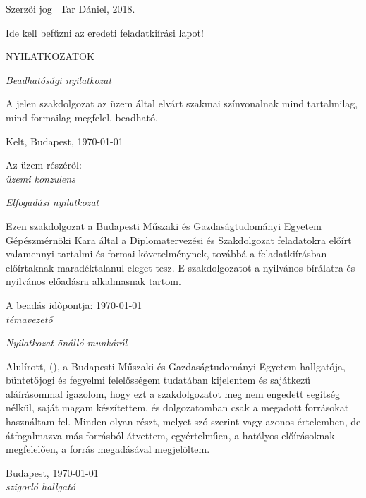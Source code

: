 \documentclass[../main.tex]{subfiles}
\begin{document}
\thispagestyle{empty}
Szerzői jog \textcopyright ~Tar Dániel, 2018.
\newpage

\thispagestyle{empty}
\begin{center}
    Ide kell befűzni az eredeti feladatkiírási lapot!
\end{center}
\newpage

\thispagestyle{plain}
\begin{center}
    \Large \MakeUppercase{Nyilatkozatok}
\end{center}

{\centering \itshape Beadhatósági nyilatkozat \par}
A jelen szakdolgozat az üzem által elvárt szakmai színvonalnak mind tartalmilag, mind formailag megfelel, beadható.

Kelt, Budapest, \today

{\hspace{0.4\textwidth} Az üzem részéről:}\\[1cm]

{\hspace{0.6\textwidth} \itshape üzemi konzulens}\\[0.1cm]

{\centering \itshape Elfogadási nyilatkozat \par}
Ezen szakdolgozat a Budapesti Műszaki és Gazdaságtudományi Egyetem Gépészmérnöki Kara által a Diplomatervezési és Szakdolgozat feladatokra előírt valamennyi tartalmi és formai követelménynek, továbbá a feladatkiírásban előírtaknak maradéktalanul eleget tesz. E szakdolgozatot a nyilvános bírálatra és nyilvános előadásra alkalmasnak tartom. 

A beadás időpontja: \today\\[1cm]

{\hspace{0.62\textwidth} \itshape témavezető}\\[0.1cm]

{\centering \itshape Nyilatkozat önálló munkáról \par}
Alulírott, \myname (\myneptun), a Budapesti Műszaki és Gazdaságtudományi Egyetem hallgatója, büntetőjogi és fegyelmi felelősségem tudatában kijelentem és sajátkezű aláírásommal igazolom, hogy ezt a szakdolgozatot meg nem engedett segítség nélkül, saját magam készítettem, és dolgozatomban csak a megadott forrásokat használtam fel. Minden olyan részt, melyet szó szerint vagy azonos értelemben, de átfogalmazva más forrásból átvettem, egyértelműen, a hatályos előírásoknak megfelelően, a forrás megadásával megjelöltem.

{Budapest, \today}\\[1cm]

{\hspace{0.6\textwidth} \itshape szigorló hallgató}
\end{document}
